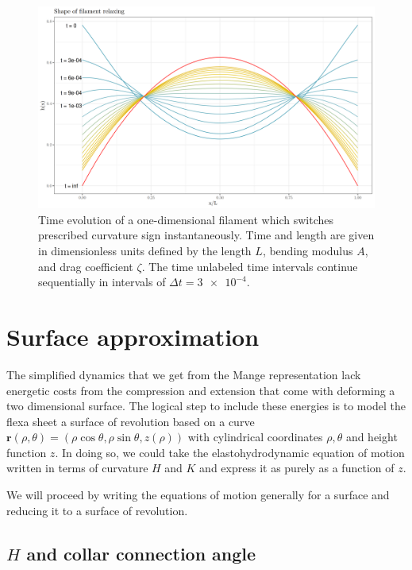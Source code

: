 \begin{figure}[bthp]
    \centering
    \includegraphics[width=\textwidth]{shapes.png}
    \caption[Dynamics of a one-dimensional filament model]{Time evolution of a one-dimensional filament which switches prescribed curvature sign instantaneously. Time and length are given in dimensionless units defined by the length $L$, bending modulus $A$, and drag coefficient $\zeta$. The time unlabeled time intervals continue sequentially in intervals of $\Delta t = \num{3e-4}$.}
    \label{fig:shapes}
\end{figure}

\section{Surface approximation}

The simplified dynamics that we get from the Mange representation lack energetic costs from the compression and extension that come with deforming a two dimensional surface. The logical step to include these energies is to model the flexa sheet a surface of revolution based on a curve $\bm{r}(\rho, \theta)=(\rho \cos \theta, \rho \sin \theta, z(\rho))$ with cylindrical coordinates $\rho, \theta$ and height function $z$. In doing so, we could take the elastohydrodynamic equation of motion written in terms of curvature $H$ and $K$ and express it as purely as a function of $z$.

We will proceed by writing the equations of motion generally for a surface and reducing it to a surface of revolution.

\subsection{$H$ and collar connection angle}

